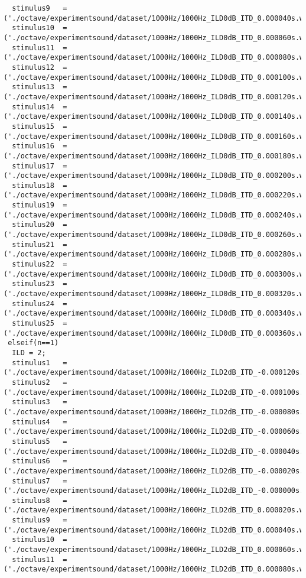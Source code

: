 {\begin{verbatim}
  stimulus9   =('./octave/experimentsound/dataset/1000Hz/1000Hz_ILD0dB_ITD_0.000040s.wav');
  stimulus10  =('./octave/experimentsound/dataset/1000Hz/1000Hz_ILD0dB_ITD_0.000060s.wav');
  stimulus11  =('./octave/experimentsound/dataset/1000Hz/1000Hz_ILD0dB_ITD_0.000080s.wav');
  stimulus12  =('./octave/experimentsound/dataset/1000Hz/1000Hz_ILD0dB_ITD_0.000100s.wav');
  stimulus13  =('./octave/experimentsound/dataset/1000Hz/1000Hz_ILD0dB_ITD_0.000120s.wav');
  stimulus14  =('./octave/experimentsound/dataset/1000Hz/1000Hz_ILD0dB_ITD_0.000140s.wav');
  stimulus15  =('./octave/experimentsound/dataset/1000Hz/1000Hz_ILD0dB_ITD_0.000160s.wav');
  stimulus16  =('./octave/experimentsound/dataset/1000Hz/1000Hz_ILD0dB_ITD_0.000180s.wav');
  stimulus17  =('./octave/experimentsound/dataset/1000Hz/1000Hz_ILD0dB_ITD_0.000200s.wav');
  stimulus18  =('./octave/experimentsound/dataset/1000Hz/1000Hz_ILD0dB_ITD_0.000220s.wav');
  stimulus19  =('./octave/experimentsound/dataset/1000Hz/1000Hz_ILD0dB_ITD_0.000240s.wav');
  stimulus20  =('./octave/experimentsound/dataset/1000Hz/1000Hz_ILD0dB_ITD_0.000260s.wav');
  stimulus21  =('./octave/experimentsound/dataset/1000Hz/1000Hz_ILD0dB_ITD_0.000280s.wav');
  stimulus22  =('./octave/experimentsound/dataset/1000Hz/1000Hz_ILD0dB_ITD_0.000300s.wav');
  stimulus23  =('./octave/experimentsound/dataset/1000Hz/1000Hz_ILD0dB_ITD_0.000320s.wav');
  stimulus24  =('./octave/experimentsound/dataset/1000Hz/1000Hz_ILD0dB_ITD_0.000340s.wav');
  stimulus25  =('./octave/experimentsound/dataset/1000Hz/1000Hz_ILD0dB_ITD_0.000360s.wav');
 elseif(n==1)
  ILD = 2;
  stimulus1   =('./octave/experimentsound/dataset/1000Hz/1000Hz_ILD2dB_ITD_-0.000120s.wav');
  stimulus2   =('./octave/experimentsound/dataset/1000Hz/1000Hz_ILD2dB_ITD_-0.000100s.wav');
  stimulus3   =('./octave/experimentsound/dataset/1000Hz/1000Hz_ILD2dB_ITD_-0.000080s.wav');
  stimulus4   =('./octave/experimentsound/dataset/1000Hz/1000Hz_ILD2dB_ITD_-0.000060s.wav');
  stimulus5   =('./octave/experimentsound/dataset/1000Hz/1000Hz_ILD2dB_ITD_-0.000040s.wav');
  stimulus6   =('./octave/experimentsound/dataset/1000Hz/1000Hz_ILD2dB_ITD_-0.000020s.wav');
  stimulus7   =('./octave/experimentsound/dataset/1000Hz/1000Hz_ILD2dB_ITD_-0.000000s.wav');
  stimulus8   =('./octave/experimentsound/dataset/1000Hz/1000Hz_ILD2dB_ITD_0.000020s.wav');
  stimulus9   =('./octave/experimentsound/dataset/1000Hz/1000Hz_ILD2dB_ITD_0.000040s.wav');
  stimulus10  =('./octave/experimentsound/dataset/1000Hz/1000Hz_ILD2dB_ITD_0.000060s.wav');
  stimulus11  =('./octave/experimentsound/dataset/1000Hz/1000Hz_ILD2dB_ITD_0.000080s.wav');

\end{verbatim}}
